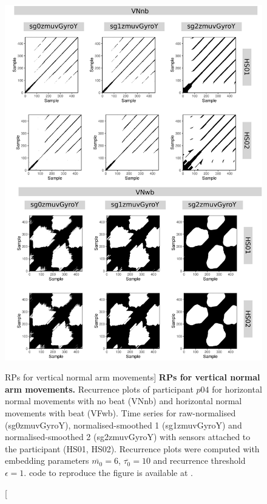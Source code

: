 \begin{figure}
\centering
\includegraphics[height=0.8\textheight]{rps_VN_w500_p04}
\caption
	[RPs for vertical normal arm movements]{
	{\bf RPs for vertical normal arm movements.}	
	Recurrence plots of participant $p04$ for 
	horizontal normal movements with no beat (VNnb) and
	horizontal normal movements with beat (VFwb).
	Time series for raw-normalised (sg0zmuvGyroY), 
	normalised-smoothed 1 (sg1zmuvGyroY) and 
	normalised-smoothed 2 (sg2zmuvGyroY) with
	sensors attached to the participant (HS01, HS02).
	Recurrence plots were computed with 
	embedding parameters $\overline{m_0}=6$, $\overline{\tau_0}=10$ and
	recurrence threshold $\epsilon=1$.
		\R code to reproduce the figure is available at 
		.
        }
    \label{fig:rps_VN_w500_p04}
\end{figure}




